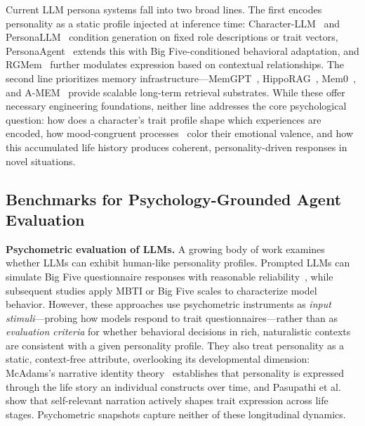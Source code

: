 \documentclass{article}
\begin{document}
Current LLM persona systems fall into two broad lines. The first encodes personality as a static profile injected at inference time: Character-LLM~\cite{shao2023character} and PersonaLLM~\cite{jiang2024personallm} condition generation on fixed role descriptions or trait vectors, PersonaAgent~\cite{zhang2025personaagent} extends this with Big Five-conditioned behavioral adaptation, and RGMem~\cite{tian2025rgmem} further modulates expression based on contextual relationships. The second line prioritizes memory infrastructure—MemGPT~\cite{packer2023memgpt}, HippoRAG~\cite{gutierrez2024hipporag}, Mem0~\cite{chhikara2025mem0}, and A-MEM~\cite{xu2025mem} provide scalable long-term retrieval substrates. While these offer necessary engineering foundations, neither line addresses the core psychological question: how does a character's trait profile shape which experiences are encoded, how mood-congruent processes~\cite{bower1981} color their emotional valence, and how this accumulated life history produces coherent, personality-driven responses in novel situations.


\subsection{Benchmarks for Psychology-Grounded Agent Evaluation}
\textbf{Psychometric evaluation of LLMs.}
A growing body of work examines whether LLMs can exhibit human-like personality profiles. Prompted LLMs can simulate Big Five questionnaire responses with reasonable reliability~\cite{serapio2023personality}, while subsequent studies apply MBTI or Big Five scales to characterize model behavior. However, these approaches use psychometric instruments as \emph{input stimuli}—probing how models respond to trait questionnaires—rather than as \emph{evaluation criteria} for whether behavioral decisions in rich, naturalistic contexts are consistent with a given personality profile. They also treat personality as a static, context-free attribute, overlooking its developmental dimension: McAdams's narrative identity theory~\cite{mcadams2001psychology} establishes that personality is expressed through the life story an individual constructs over time, and Pasupathi et al.~\cite{pasupathi2007developing} show that self-relevant narration actively shapes trait expression across life stages. Psychometric snapshots capture neither of these longitudinal dynamics.
\end{document}
